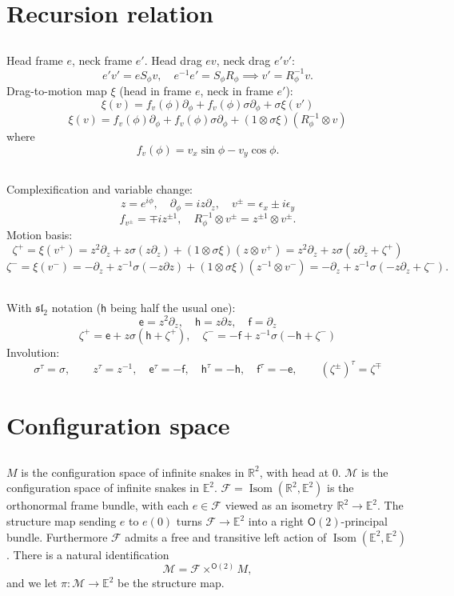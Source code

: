 \documentclass{amsart}
\def\RR{\mathbb{R}}
\def\EE{\mathbb{E}}
\def\e{\mathsf{e}}
\def\h{\mathsf{h}}
\def\f{\mathsf{f}}
\def\sF{\mathscr{F}}
\def\sM{\mathscr{M}}
\def\inv{\tau} %
\DeclareMathOperator{\Isom}{\mathrm{Isom}}
\def\O{\mathsf{O}}
\theoremstyle{definition}
\begin{document}
\section{Recursion relation}
\subsection{}
Head frame $e$, neck frame $e'$. Head drag $ev$, neck drag $e'v'$:
$$ e'v'= e S_\phi v,\quad e^{-1}e' = S_\phi R_\phi \implies v' = R_{\phi}^{-1}v. $$
Drag-to-motion map $\xi$ (head in frame $e$, neck in frame $e'$):
$$ \xi(v) = f_v(\phi)\partial_\phi + f_v(\phi)\sigma\partial_\phi + \sigma \xi(v') $$
$$ \xi(v) = f_v(\phi)\partial_\phi + f_v(\phi)\sigma\partial_\phi + (1\otimes\sigma\xi)(R_\phi^{-1}\otimes v) $$
where
$$ f_v(\phi) = v_x\sin\phi - v_y\cos\phi.$$
\subsection{}
Complexification and variable change:
$$ z = e^{i\phi},\quad \partial_\phi = iz\partial_z,\quad v^\pm = \epsilon_x \pm i\epsilon_y $$
$$ f_{v^\pm} = \mp i z^{\pm 1},\quad
R_\phi^{-1} \otimes v^{\pm} = z^{\pm 1} \otimes v^{\pm}.$$
Motion basis:
$$ \zeta^+ = \xi(v^+) = z^2\partial_z + z \sigma (z\partial_z) + (1\otimes \sigma\xi)(z\otimes v^+)
= z^2\partial_z + z\sigma(z\partial_z + \zeta^+) $$
$$ \zeta^- = \xi(v^-) =- \partial_z + z^{-1}\sigma(-z\partial z) + (1\otimes\sigma\xi)(z^{-1}\otimes v^-)
= -\partial_z + z^{-1}\sigma(-z\partial_z + \zeta^-). $$
\subsection{}
With $\mathfrak{sl}_2$ notation ($\h$ being half the usual one):
$$ \e = z^2\partial_z,\quad \h = z\partial z,\quad \f = \partial_z $$
$$\zeta^+ = \e + z\sigma(\h + \zeta^+),\quad \zeta^- = -\f + z^{-1}\sigma(-\h + \zeta^-)$$
Involution:
$$ \sigma^\inv=\sigma,\qquad z^\inv = z^{-1},\quad \e^\inv=-\f,\quad \h^\inv=-\h,\quad \f^\inv=-\e,
\qquad
\left(\zeta^{\pm}\right)^\inv=\zeta^\mp $$
 
\section{Configuration space}
\subsection{}
$M$ is the configuration space of infinite snakes in $\RR^2$,
with head at $0$. $\sM$ is the configuration space of infinite snakes in $\EE^2$.
$\sF = \Isom(\RR^2,\EE^2)$ is the orthonormal frame bundle, with each $e\in\sF$ viewed as an isometry 
$\RR^2\to\EE^2$. The structure map sending $e$ to $e(0)$ turns
$\sF\to\EE^2$ into a right $\O(2)$-principal bundle. Furthermore $\sF$
admits a free and transitive left action of $\Isom(\EE^2,\EE^2)$. There is a natural identification
$$ \sM = \sF \times^{\O(2)} M,  $$
and we let $\pi:\sM \to \EE^2$ be the structure map.
\end{document}
